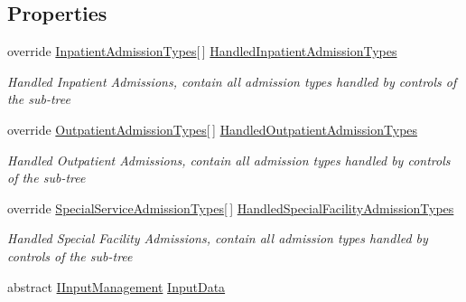 \subsection*{Properties}
\begin{DoxyCompactItemize}
\item 
override \hyperlink{class_general_health_care_elements_1_1_treatment_admission_types_1_1_inpatient_admission_types}{Inpatient\+Admission\+Types}\mbox{[}$\,$\mbox{]} \hyperlink{class_general_health_care_elements_1_1_management_1_1_control_unit_management_a649f83137a13ad5a988135af4f46a331}{Handled\+Inpatient\+Admission\+Types}
\begin{DoxyCompactList}\small\item\em Handled Inpatient Admissions, contain all admission types handled by controls of the sub-\/tree \end{DoxyCompactList}\item 
override \hyperlink{class_general_health_care_elements_1_1_treatment_admission_types_1_1_outpatient_admission_types}{Outpatient\+Admission\+Types}\mbox{[}$\,$\mbox{]} \hyperlink{class_general_health_care_elements_1_1_management_1_1_control_unit_management_ad85ed230f37f23b3d50d25e9a93b9d58}{Handled\+Outpatient\+Admission\+Types}
\begin{DoxyCompactList}\small\item\em Handled Outpatient Admissions, contain all admission types handled by controls of the sub-\/tree \end{DoxyCompactList}\item 
override \hyperlink{class_general_health_care_elements_1_1_treatment_admission_types_1_1_special_service_admission_types}{Special\+Service\+Admission\+Types}\mbox{[}$\,$\mbox{]} \hyperlink{class_general_health_care_elements_1_1_management_1_1_control_unit_management_a3e663125bcba357ae48eb2014f67a95e}{Handled\+Special\+Facility\+Admission\+Types}
\begin{DoxyCompactList}\small\item\em Handled Special Facility Admissions, contain all admission types handled by controls of the sub-\/tree \end{DoxyCompactList}\item 
abstract \hyperlink{interface_general_health_care_elements_1_1_management_1_1_i_input_management}{I\+Input\+Management} \hyperlink{class_general_health_care_elements_1_1_management_1_1_control_unit_management_aa2446a085b9cbd04632a0ff27434708e}{Input\+Data}

\end{DoxyCompactItemize}
